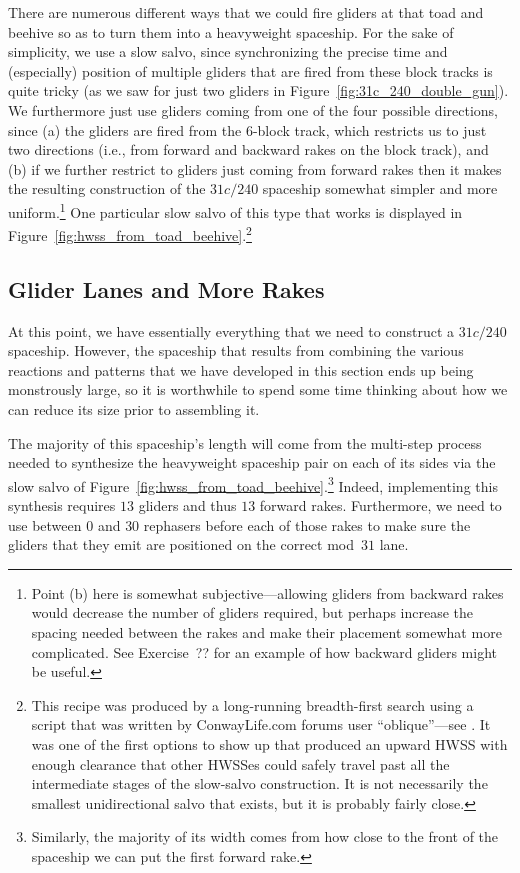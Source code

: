 There are numerous different ways that we could fire gliders at that toad and beehive so as to turn them into a heavyweight spaceship. For the sake of simplicity, we use a slow salvo, since synchronizing the precise time and (especially) position of multiple gliders that are fired from these block tracks is quite tricky (as we saw for just two gliders in Figure~\ref{fig:31c_240_double_gun}). We furthermore just use gliders coming from one of the four possible directions, since (a) the gliders are fired from the $6$-block track, which restricts us to just two directions (i.e., from forward and backward rakes on the block track), and (b) if we further restrict to gliders just coming from forward rakes then it makes the resulting construction of the $31c/240$ spaceship somewhat simpler and more uniform.\footnote{Point (b) here is somewhat subjective---allowing gliders from backward rakes would decrease the number of gliders required, but perhaps increase the spacing needed between the rakes and make their placement somewhat more complicated. See Exercise~?? for an example of how backward gliders might be useful.} One particular slow salvo of this type that works is displayed in Figure~\ref{fig:hwss_from_toad_beehive}.\footnote{This recipe was produced by a long-running breadth-first search using a script that was written by ConwayLife.com forums user ``oblique''---see . It was one of the first options to show up that produced an upward HWSS with enough clearance that other HWSSes could safely travel past all the intermediate stages of the slow-salvo construction. It is not necessarily the smallest unidirectional salvo that exists, but it is probably fairly close.}


\subsection{Glider Lanes and More Rakes}\label{sec:silverfish_more_rakes}

At this point, we have essentially everything that we need to construct a $31c/240$ spaceship. However, the spaceship that results from combining the various reactions and patterns that we have developed in this section ends up being monstrously large, so it is worthwhile to spend some time thinking about how we can reduce its size prior to assembling it.

The majority of this spaceship's length will come from the multi-step process needed to synthesize the heavyweight spaceship pair on each of its sides via the slow salvo of Figure~\ref{fig:hwss_from_toad_beehive}.\footnote{Similarly, the majority of its width comes from how close to the front of the spaceship we can put the first forward rake.} Indeed, implementing this synthesis requires $13$ gliders and thus $13$ forward rakes. Furthermore, we need to use between $0$ and $30$ rephasers before each of those rakes to make sure the gliders that they emit are positioned on the correct mod~$31$ lane.


